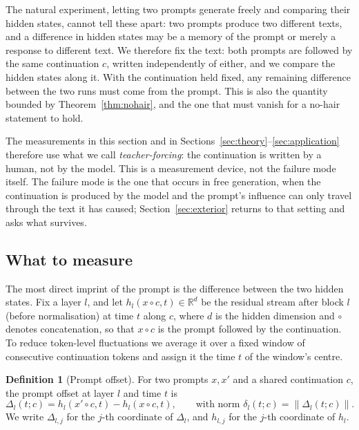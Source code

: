 \documentclass[11pt]{article}
\theoremstyle{definition}
\newtheorem{definition}{Definition}
\theoremstyle{remark}
\begin{document}
The natural experiment, letting two prompts generate freely and comparing their hidden states, cannot tell these apart: two prompts produce two different texts, and a difference in hidden states may be a memory of the prompt or merely a response to different text. We therefore fix the text: both prompts are followed by the same continuation $c$, written independently of either, and we compare the hidden states along it. With the continuation held fixed, any remaining difference between the two runs must come from the prompt. This is also the quantity bounded by Theorem~\ref{thm:nohair}, and the one that must vanish for a no-hair statement to hold.

The measurements in this section and in Sections~\ref{sec:theory}--\ref{sec:application} therefore use what we call \emph{teacher-forcing}: the continuation is written by a human, not by the model. This is a measurement device, not the failure mode itself. The failure mode is the one that occurs in free generation, when the continuation is produced by the model and the prompt's influence can only travel through the text it has caused; Section~\ref{sec:exterior} returns to that setting and asks what survives.
\subsection{What to measure}\label{sec:measure-def}

The most direct imprint of the prompt is the difference between the two hidden states. Fix a layer $l$, and let $h_l(x\circ c,t)\in\mathbb R^d$ be the residual stream after block $l$ (before normalisation) at time $t$ along $c$, where $d$ is the hidden dimension and $\circ$ denotes concatenation, so that $x\circ c$ is the prompt followed by the continuation. To reduce token-level fluctuations we average it over a fixed window of consecutive continuation tokens and assign it the time $t$ of the window's centre.

\begin{definition}[Prompt offset]\label{def:offset}
For two prompts $x,x'$ and a shared continuation $c$, the prompt offset at layer $l$ and time $t$ is
\[
\Delta_l(t;c)=h_l(x'\circ c,t)-h_l(x\circ c,t),\qquad\text{with norm }\delta_l(t;c)=\|\Delta_l(t;c)\|.
\]
We write $\Delta_{l,j}$ for the $j$-th coordinate of $\Delta_l$, and $h_{l,j}$ for the $j$-th coordinate of $h_l$.
\end{definition}
\end{document}
